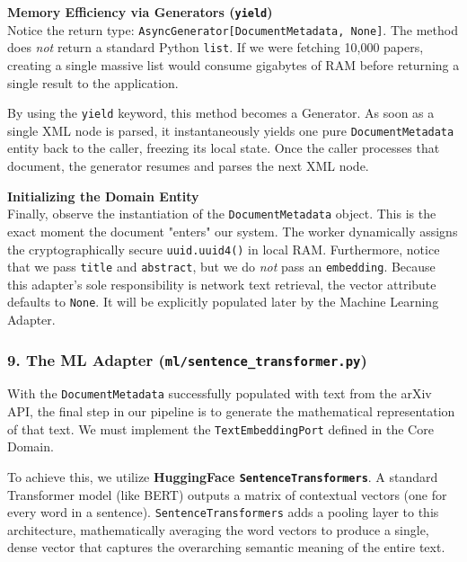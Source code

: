 \textbf{Memory Efficiency via Generators (\texttt{yield})} \\
Notice the return type: \texttt{AsyncGenerator[DocumentMetadata, None]}. The method does \textit{not} return a standard Python \texttt{list}. If we were fetching 10,000 papers, creating a single massive list would consume gigabytes of RAM before returning a single result to the application.

By using the \texttt{yield} keyword, this method becomes a Generator. As soon as a single XML node is parsed, it instantaneously yields one pure \texttt{DocumentMetadata} entity back to the caller, freezing its local state. Once the caller processes that document, the generator resumes and parses the next XML node.

\textbf{Initializing the Domain Entity} \\
Finally, observe the instantiation of the \texttt{DocumentMetadata} object. This is the exact moment the document "enters" our system. The worker dynamically assigns the cryptographically secure \texttt{uuid.uuid4()} in local RAM. Furthermore, notice that we pass \texttt{title} and \texttt{abstract}, but we do \textit{not} pass an \texttt{embedding}. Because this adapter's sole responsibility is network text retrieval, the vector attribute defaults to \texttt{None}. It will be explicitly populated later by the Machine Learning Adapter.







\subsubsection*{9. The ML Adapter (\texttt{ml/sentence\_transformer.py})}

With the \texttt{DocumentMetadata} successfully populated with text from the arXiv API, the final step in our pipeline is to generate the mathematical representation of that text. We must implement the \texttt{TextEmbeddingPort} defined in the Core Domain.

To achieve this, we utilize \textbf{HuggingFace \texttt{SentenceTransformers}}. A standard Transformer model (like BERT) outputs a matrix of contextual vectors (one for every word in a sentence). \texttt{SentenceTransformers} adds a pooling layer to this architecture, mathematically averaging the word vectors to produce a single, dense vector that captures the overarching semantic meaning of the entire text.

